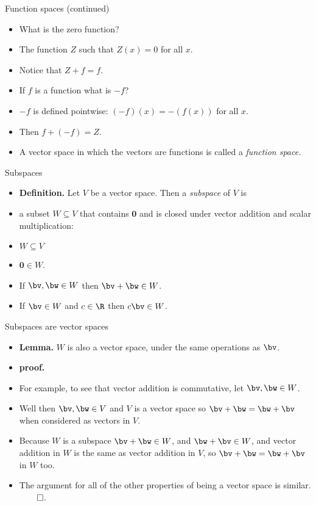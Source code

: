 \documentclass{beamer}
\begin{document}
\begin{frame}{Function spaces (continued)}

\begin{itemize}
\item What is the zero function?
\item The function $Z$ such that $Z(x) = 0$ for all $x$.
\item Notice that $Z + f = f$.
\item If $f$ is a function what is $-f$?
\item $-f$ is defined pointwise: $(-f)(x)  = -(f(x))$ for all $x$.
\item Then $f+(-f) = Z$.
\item A vector space in which the vectors are functions is called
a \emph{function space.}
\end{itemize}
\end{frame}

\begin{frame}{Subspaces}

\begin{itemize}
\item \textbf{Definition.} Let $V$ be a vector space. Then a \emph{subspace}
of $V$ is
\item  a subset $W\subseteq V$ that contains $\mathbf{0}$ and is closed
under vector addition and scalar multiplication:
\item $W\subseteq V$
\item $\mathbf{0} \in W$.
\item If $\bv,\bw\in W$ then $\bv+\bw\in W$.
\item If $\bv\in W$ and $c\in \R$ then $c\bv\in W$.
\end{itemize}
\end{frame}

\begin{frame}{Subspaces are vector spaces}

\begin{itemize}
\item \textbf{Lemma.} $W$ is also a vector space, under the same operations
as $\bv$.
\item \textbf{proof.}
\item For example, to see that vector addition is commutative, let
$\bv,\bw\in W$.
\item Well then $\bv,\bw\in V$ and $V$ is a vector space so $\bv+\bw=\bw+\bv$
when considered as vectors in $V$.
\item Because $W$ is a subspace $\bv + \bw\in W$, and $\bw + \bv\in W$,
and vector addition in $W$ is the same as vector addition in $V$, so
$\bv+\bw=\bw+\bv$ in $W$ too.
\item The argument for all of the other properties of being a vector space
is similar. $\qed$.
\end{itemize}
\end{frame}
\end{document}
